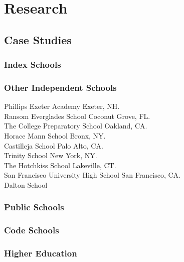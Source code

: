 
\chapter{Research} %

\label{Chapter1} %



\section{Case Studies}
\subsection{Index Schools}
\subsection{Other Independent Schools}
Phillips Exeter Academy Exeter, NH. \\
Ransom Everglades School Coconut Grove, FL. \\
The College Preparatory School Oakland, CA. \\
Horace Mann School Bronx, NY. \\
Castilleja School Palo Alto, CA. \\
Trinity School New York, NY. \\
The Hotchkiss School Lakeville, CT. \\
San Francisco University High School San Francisco, CA. \\
Dalton School \\
\subsection{Public Schools}
\subsection{Code Schools}
\subsection{Higher Education}

